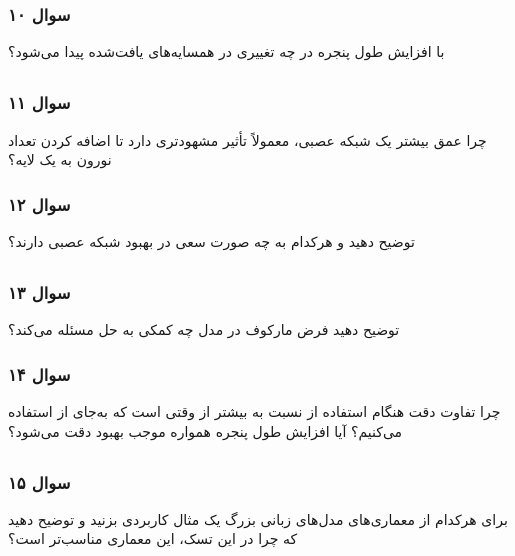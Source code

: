 \documentclass[12pt]{article}
\begin{document}
	\subsubsection*{سوال ۱۰}
	با افزایش طول پنجره در 
	چه تغییری در همسایه‌های یافت‌شده پیدا می‌شود؟
	
	\subsection{}
	\subsubsection*{سوال ۱۱}
	چرا عمق بیشتر یک شبکه عصبی، معمولاً تأثیر مشهودتری دارد تا اضافه کردن تعداد نورون به یک لایه؟
	
	\subsubsection*{سوال ۱۲}
	توضیح دهید 
	و
	هرکدام به چه صورت سعی در بهبود شبکه عصبی دارند؟
	
	\subsection{}
	\subsubsection*{سوال ۱۳}
	توضیح دهید فرض مارکوف در مدل 
	چه کمکی به حل مسئله می‌کند؟
	
	\subsubsection*{سوال ۱۴}
	چرا تفاوت دقت هنگام استفاده از
	نسبت به 
	بیشتر از وقتی است که به‌جای 
	از
	استفاده می‌کنیم؟ آیا افزایش طول پنجره همواره موجب بهبود دقت می‌شود؟ 
	
	\subsection{}
	\subsubsection*{سوال ۱۵}
	برای هرکدام از معماری‌های مدل‌های زبانی بزرگ یک مثال کاربردی بزنید و توضیح دهید که چرا در این تسک، این معماری مناسب‌تر است؟
	
\end{document}
